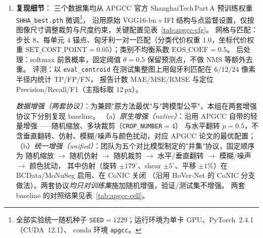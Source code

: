 \begin{enumerate}
    \item \textbf{复现细节}：
    三个数据集均从 APGCC 官方 ShanghaiTech\,Part\,A 预训练权重 \texttt{SHHA\_best.pth} 微调\footnote{%
    全部实验统一随机种子 \texttt{SEED}$=1229$；运行环境为单卡 GPU、PyTorch~2.4.1（CUDA~12.1）、
    conda 环境 \texttt{apgcc}。}，
    沿用原始 VGG16-bn\,+\,IFI 结构与点监督设置，仅按图像尺寸调整裁剪与尺度约束，关键配置见表~\ref{tab:apgcc-cfg}。
    网格与匹配：步长 $8$、每单元 $4$ 锚点、匈牙利一对一匹配（分类代价权重 $1.0$，坐标代价权重
    $\text{SET\_COST\_POINT}=0.05$）；类别不均衡系数 $\text{EOS\_COEF}=0.5$。
    后处理：softmax 前景概率，固定阈值 $\theta=0.5$ 保留预测点，不做 NMS 等额外去重。
    评测：以 \texttt{eval\_centroid} 在测试集整图上用匈牙利匹配在 $6/12/24$ 像素半径内统计 TP/FP/FN，
    报告计数 MAE/MSE/RMSE 与定位 Precision/Recall/F1（主指标取 $12$\,px）。

    \emph{数据增强（两套协议）}：为兼顾"原方法最优"与"跨模型公平"，本组在两套增强协议下分别复现 baseline。
    （a）\emph{原生增强（native）}：沿用 APGCC 自带的轻量增强——随机缩放、多块裁剪（\texttt{CROP\_NUMBER}$=4$）
    与水平翻转 $p{=}0.5$，不含垂直翻转、仿射、模糊/噪声与颜色扰动，对应 APGCC 论文的最优配置；
    （b）\emph{统一增强（unified）}：团队为五个对比模型制定的"并集"协议，固定顺序为
    随机缩放 $\to$ 随机仿射 $\to$ 随机裁剪 $\to$ 水平/垂直翻转 $\to$ 模糊/噪声 $\to$ 颜色扰动，
    其中仿射（旋转 $\pm179^\circ$、shear $\pm5^\circ$、平移 $\pm1\%$）在 BCData/MoNuSeg 启用、在 CoNIC 关闭
    （沿用 HoVer-Net 的 CoNIC 分支做法）。两套协议\emph{均只对训练集}施加随机增强，验证/测试集不增强。
    两套 baseline 的对照结果见表~\ref{tab:apgcc-cell}。


\end{enumerate}
